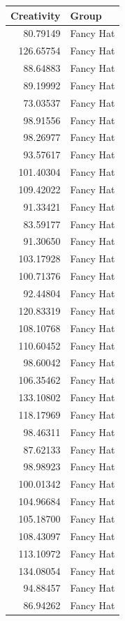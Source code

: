 \documentclass[]{tufte-handout}
\begin{document}
\begin{table}
\centering
\begin{tabular}[t]{r|l}
\hline
Creativity & Group\\
\hline
80.79149 & Fancy Hat\\
\hline
126.65754 & Fancy Hat\\
\hline
88.64883 & Fancy Hat\\
\hline
89.19992 & Fancy Hat\\
\hline
73.03537 & Fancy Hat\\
\hline
98.91556 & Fancy Hat\\
\hline
98.26977 & Fancy Hat\\
\hline
93.57617 & Fancy Hat\\
\hline
101.40304 & Fancy Hat\\
\hline
109.42022 & Fancy Hat\\
\hline
91.33421 & Fancy Hat\\
\hline
83.59177 & Fancy Hat\\
\hline
91.30650 & Fancy Hat\\
\hline
103.17928 & Fancy Hat\\
\hline
100.71376 & Fancy Hat\\
\hline
92.44804 & Fancy Hat\\
\hline
120.83319 & Fancy Hat\\
\hline
108.10768 & Fancy Hat\\
\hline
110.60452 & Fancy Hat\\
\hline
98.60042 & Fancy Hat\\
\hline
106.35462 & Fancy Hat\\
\hline
133.10802 & Fancy Hat\\
\hline
118.17969 & Fancy Hat\\
\hline
98.46311 & Fancy Hat\\
\hline
87.62133 & Fancy Hat\\
\hline
98.98923 & Fancy Hat\\
\hline
100.01342 & Fancy Hat\\
\hline
104.96684 & Fancy Hat\\
\hline
105.18700 & Fancy Hat\\
\hline
108.43097 & Fancy Hat\\
\hline
113.10972 & Fancy Hat\\
\hline
134.08054 & Fancy Hat\\
\hline
94.88457 & Fancy Hat\\
\hline
86.94262 & Fancy Hat\\
\hline

\end{tabular}
\end{table}
\end{document}
